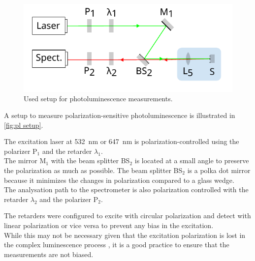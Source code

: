 \documentclass[
	oneside,
	parskip=half,
	a4paper,
]{scrbook}
\begin{document}
\begin{figure}
	\centering
	\includegraphics{../figures/setup_simplified.pdf}
	\caption{Used setup for photoluminescence measurements.}
	\label{fig:pl setup}
\end{figure}
A setup to measure polarization-sensitive photoluminescence is illustrated in \autoref{fig:pl setup}.

The excitation laser at \SI{532}{nm} or \SI{647}{nm} is polarization-controlled using the polarizer P$_1$ and the retarder $\lambda_1$.\\
The mirror M$_1$ with the beam splitter BS$_2$ is located at a small angle to preserve the polarization as much as possible.
The beam splitter BS$_2$ is a polka dot mirror because it minimizes the changes in polarization compared to a glass wedge.\\
The analysation path to the spectrometer is also polarization controlled with the retarder $\lambda_2$ and the polarizer P$_2$.

The retarders were configured to excite with circular polarization and detect with linear polarization or vice versa to prevent any bias in the excitation.\\
While this may not be necessary given that the excitation polarization is lost in the complex luminescence process \cite{NiPS3_linear}, it is a good practice to ensure that the measurements are not biased.
\end{document}
